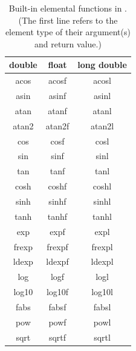 \begin{table}[h]
 \caption[Built-in elemental functions in {\XMPC}]{Built-in elemental
 functions in {\XMPC}. (The first line refers to the element type of their
 argument(s) and return value.)}
 \label{tab:elemental_c}
 \begin{center}
 \begin{tabular}{c|c|c} \hline\hline
 double & float & long double \\ \hline
 acos & acosf & acosl \\
 asin & asinf & asinl \\
 atan & atanf & atanl \\
 atan2 & atan2f & atan2l \\
 cos & cosf & cosl \\
 sin & sinf & sinl \\
 tan & tanf & tanl \\

 cosh & coshf & coshl \\
 sinh & sinhf & sinhl \\
 tanh & tanhf & tanhl \\

 exp & expf & expl \\
 frexp & frexpf & frexpl \\
 ldexp & ldexpf & ldexpl \\
 log & logf & logl \\
 log10 & log10f & log10l \\

 fabs & fabsf & fabsl \\
 pow & powf & powl \\
 sqrt & sqrtf & sqrtl \\


\end{tabular}
\end{center}
\end{table}
